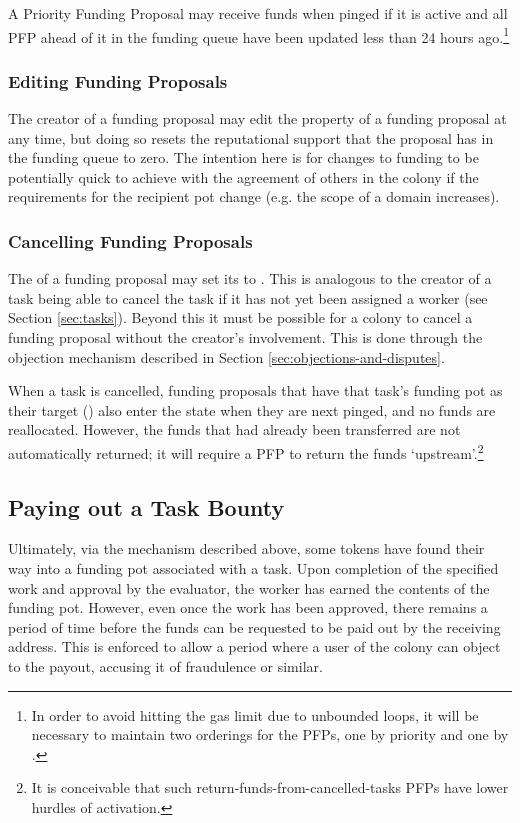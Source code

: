 A Priority Funding Proposal may receive funds when pinged if it is active and all PFP ahead of it in the funding queue have been updated less than 24 hours ago.\footnote{In order to avoid hitting the gas limit due to unbounded loops, it will be necessary to maintain two orderings for the PFPs, one by priority and one by . }

\subsubsection{Editing Funding Proposals}
The creator of a funding proposal may edit the  property of a funding proposal at any time, but doing so resets the reputational support that the proposal has in the funding queue to zero. The intention here is for changes to funding to be potentially quick to achieve with the agreement of others in the colony if the requirements for the recipient pot change (e.g. the scope of a domain increases).

\subsubsection{Cancelling Funding Proposals}
The  of a funding proposal may set its  to . This is analogous to the creator of a task being able to cancel the task if it has not yet been assigned a worker (see Section \ref{sec:tasks}). Beyond this it must be possible for a colony to cancel a funding proposal without the creator's involvement. This is done through the objection mechanism described in Section \ref{sec:objections-and-disputes}.

When a task is cancelled, funding proposals that have that task's funding pot as their target () also enter the  state when they are next pinged, and no funds are reallocated. However, the funds that had already been transferred are not automatically returned; it will require a PFP to return the funds `upstream'.\footnote{It is conceivable that such return-funds-from-cancelled-tasks PFPs have lower hurdles of activation.}

\subsection{Paying out a Task Bounty}\label{sec:claiming-bounty}
Ultimately, via the mechanism described above, some tokens have found their way into a funding pot associated with a task. Upon completion of the specified work and approval by the evaluator, the worker has earned the contents of the funding pot. However, even once the work has been approved, there remains a period of time before the funds can be requested to be paid out by the receiving address. This is enforced to allow a period where a user of the colony can object to the payout, accusing it of fraudulence or similar.

